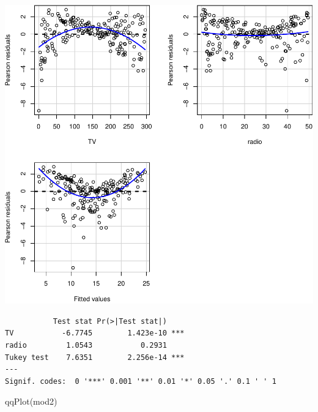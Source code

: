 \documentclass[
]{article}
\newenvironment{Shaded}{\begin{snugshade}}{\end{snugshade}}
\newcommand{\FunctionTok}[1]{\textcolor[rgb]{0.00,0.00,0.00}{#1}}
\newcommand{\NormalTok}[1]{#1}
\begin{document}
\begin{center}\includegraphics{SDM-CHAP24_files/figure-latex/daignos-1} \end{center}

\begin{verbatim}
           Test stat Pr(>|Test stat|)    
TV           -6.7745        1.423e-10 ***
radio         1.0543           0.2931    
Tukey test    7.6351        2.256e-14 ***
---
Signif. codes:  0 '***' 0.001 '**' 0.01 '*' 0.05 '.' 0.1 ' ' 1
\end{verbatim}

\begin{Shaded}
\begin{Highlighting}[]
\FunctionTok{qqPlot}\NormalTok{(mod2)}
\end{Highlighting}
\end{Shaded}
\end{document}
